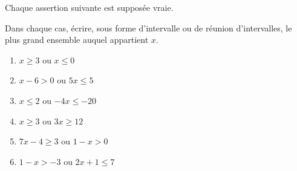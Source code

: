 \begin{exo}{}
	Chaque assertion suivante est supposée vraie.

	Dans chaque cas, écrire, sous forme d'intervalle ou de réunion d'intervalles, le plus grand ensemble auquel appartient $x$.

	\begin{enumerate}[itemsep=2mm]
		\item $x \ge 3$ ou $x \le 0$
		\item $x - 6 > 0$ ou $5x \le 5$
		\item $x \le 2$ ou $-4x \le -20$
		\item $x \ge 3$ ou $3x \ge 12$
		\item $7x - 4 \ge 3$ ou $1 - x > 0$
		\item $1 - x > -3$ ou $2x + 1 \le 7$
	\end{enumerate}
\end{exo}
